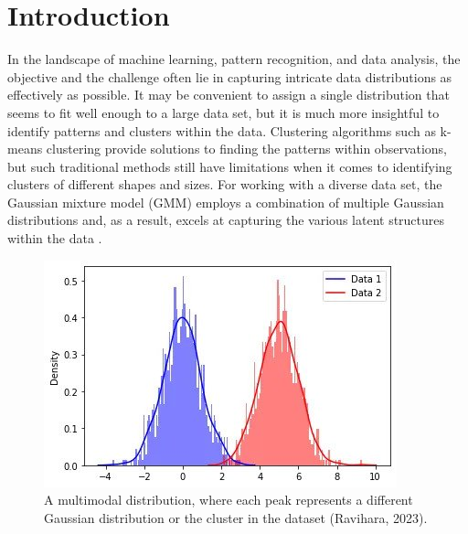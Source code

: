 \documentclass[12pt]{article}
\begin{document}
\vfill

\newpage
{} %

\hypertarget{introduction}{%
\section{Introduction}\label{introduction}}

In the landscape of machine learning, pattern recognition, and data
analysis, the objective and the challenge often lie in capturing
intricate data distributions as effectively as possible. It may be
convenient to assign a single distribution that seems to fit well enough
to a large data set, but it is much more insightful to identify patterns
and clusters within the data. Clustering algorithms such as k-means
clustering provide solutions to finding the patterns within
observations, but such traditional methods still have limitations when
it comes to identifying clusters of different shapes and sizes. For
working with a diverse data set, the Gaussian mixture model (GMM)
employs a combination of multiple Gaussian distributions and, as a
result, excels at capturing the various latent structures within the
data \citep{kumar2022gaussian}.

\begin{figure}
\centering
\includegraphics{3.jpg}
\caption{A multimodal distribution, where each peak represents a
different Gaussian distribution or the cluster in the dataset (Ravihara,
2023).}
\end{figure}
\end{document}
